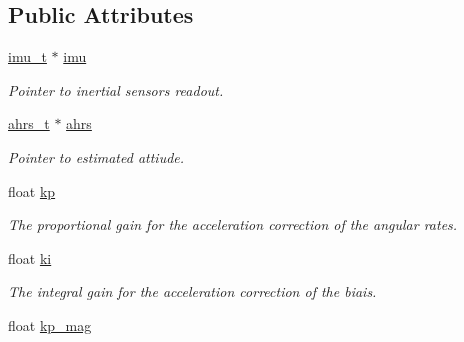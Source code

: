 \subsection*{Public Attributes}
\begin{DoxyCompactItemize}
\item 
\hypertarget{structqfilter__t_a865a3bb2a559ce8858a53af6d1f8bc2d}{\hyperlink{structimu__t}{imu\+\_\+t} $\ast$ \hyperlink{structqfilter__t_a865a3bb2a559ce8858a53af6d1f8bc2d}{imu}}\label{structqfilter__t_a865a3bb2a559ce8858a53af6d1f8bc2d}

\begin{DoxyCompactList}\small\item\em Pointer to inertial sensors readout. \end{DoxyCompactList}\item 
\hypertarget{structqfilter__t_add4a07787495611044f7441c4c83e681}{\hyperlink{structahrs__t}{ahrs\+\_\+t} $\ast$ \hyperlink{structqfilter__t_add4a07787495611044f7441c4c83e681}{ahrs}}\label{structqfilter__t_add4a07787495611044f7441c4c83e681}

\begin{DoxyCompactList}\small\item\em Pointer to estimated attiude. \end{DoxyCompactList}\item 
\hypertarget{structqfilter__t_ad6630f81781d3ebc0f9f59b52342c1dd}{float \hyperlink{structqfilter__t_ad6630f81781d3ebc0f9f59b52342c1dd}{kp}}\label{structqfilter__t_ad6630f81781d3ebc0f9f59b52342c1dd}

\begin{DoxyCompactList}\small\item\em The proportional gain for the acceleration correction of the angular rates. \end{DoxyCompactList}\item 
\hypertarget{structqfilter__t_a9ab0c422ee1a4586edac922e354d309a}{float \hyperlink{structqfilter__t_a9ab0c422ee1a4586edac922e354d309a}{ki}}\label{structqfilter__t_a9ab0c422ee1a4586edac922e354d309a}

\begin{DoxyCompactList}\small\item\em The integral gain for the acceleration correction of the biais. \end{DoxyCompactList}\item 
\hypertarget{structqfilter__t_ae8445fb02e62262031a7e214f0f8377b}{float \hyperlink{structqfilter__t_ae8445fb02e62262031a7e214f0f8377b}{kp\+\_\+mag}}\label{structqfilter__t_ae8445fb02e62262031a7e214f0f8377b}


\end{DoxyCompactItemize}
